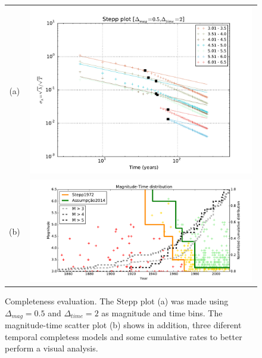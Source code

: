 \documentclass[draft, grl]{agutex}
\begin{document}
\begin{figure}
	\begin{center}
	\begin{table}[H]
		\begin{tabular}{ c c }
		\footnotesize(a)
        & \includegraphics[width=0.99\textwidth]{z_img_completeness_temporal_stepp}
		\\
		\footnotesize(b)
		& \includegraphics[width=0.99\textwidth]{z_img_completeness_temporal_scatter}
		\end{tabular}
	\end{table}
	\caption{Completeness evaluation. 
	The Stepp plot (a) was made using $\Delta_{mag}=0.5$ and $\Delta_{time}=2$ as magnitude and time bins. The magnitude-time scatter plot (b) shows in addition, three diferent temporal completess models and some cumulative rates to better perform a visual analysis.}
	\label{fig_completeness}
	\end{center}
\end{figure}
\end{document}
